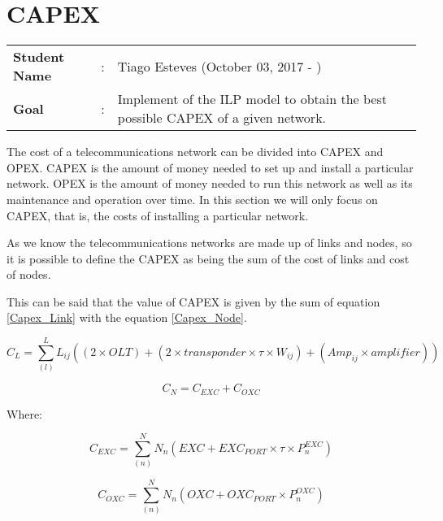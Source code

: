 \clearpage

\section{CAPEX}
\begin{tcolorbox}	
\begin{tabular}{p{2.75cm} p{0.2cm} p{10.5cm}} 	
\textbf{Student Name}  &:& Tiago Esteves    (October 03, 2017 - )\\
\textbf{Goal}          &:& Implement of the ILP model to obtain the best possible CAPEX of a given network.
\end{tabular}
\end{tcolorbox}
\vspace{11pt}

The cost of a telecommunications network can be divided into CAPEX and OPEX.
CAPEX is the amount of money needed to set up and install a particular network.
OPEX is the amount of money needed to run this network as well as its maintenance and operation over time.
In this section we will only focus on CAPEX, that is, the costs of installing a particular network.

As we know the telecommunications networks are made up of links and nodes, so it is possible to define the CAPEX as being the sum of the cost of links and cost of nodes.

This can be said that the value of CAPEX is given by the sum of equation \ref{Capex_Link} with the equation \ref{Capex_Node}.

\begin{equation}
C_L = \sum_{(l)}^L L_{ij} \left( (2 \times OLT) + (2 \times transponder \times \tau \times W_{ij}) +  (Amp_{ij} \times amplifier) \right)
\label{Capex_Link}
\end{equation}

\begin{equation}
C_N = C_{EXC} + C_{OXC}
\label{Capex_Node}
\end{equation}

Where:

\begin{equation}
C_{EXC} = \sum_{(n)}^N N_{n} \left(EXC + EXC_{PORT} \times \tau \times P^{EXC}_{n} \right)
\label{Capex_Node_EXC}
\end{equation}

\begin{equation}
C_{OXC} = \sum_{(n)}^N N_{n} \left(OXC + OXC_{PORT} \times P^{OXC}_{n} \right)
\label{Capex_Node_OXC}
\end{equation}


